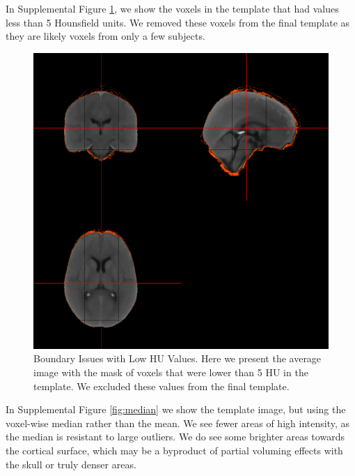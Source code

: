 \documentclass[]{elsarticle} %
\makeatletter
\def\maxwidth{\ifdim\Gin@nat@width>\linewidth\linewidth
\else\Gin@nat@width\fi}
\let\Oldincludegraphics\includegraphics
\renewcommand{\includegraphics}[1]{\Oldincludegraphics[width=\maxwidth]{#1}}
\makeatother
\begin{document}
In Supplemental Figure \ref{fig:boundary}, we show the voxels in the template that had values less than 5 Hounsfield units. We removed these voxels from the final template as they are likely voxels from only a few subjects.

\begin{figure}
\centering
\includegraphics{index_files/figure-latex/sd_image.pdf}
\caption{\label{fig:boundary}Boundary Issues with Low HU Values. Here we present the average image with the mask of voxels that were lower than 5 HU in the template. We excluded these values from the final template.}
\end{figure}

In Supplemental Figure \ref{fig:median} we show the template image, but using the voxel-wise median rather than the mean. We see fewer areas of high intensity, as the median is resistant to large outliers. We do see some brighter areas towards the cortical surface, which may be a byproduct of partial voluming effects with the skull or truly denser areas.
\end{document}
